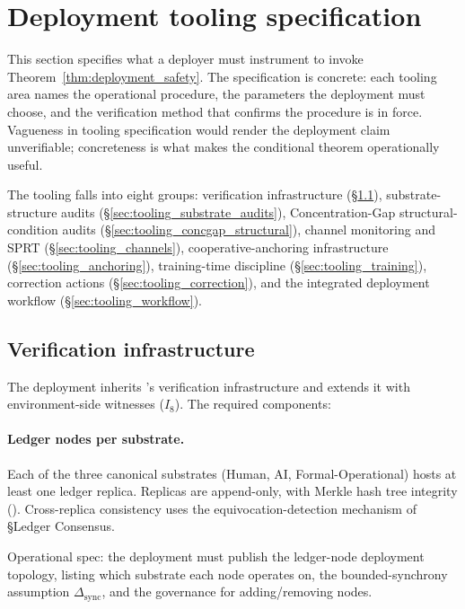 \section{Deployment tooling specification}
\label{sec:deployment_tooling}

This section specifies what a deployer must instrument to invoke
Theorem~\ref{thm:deployment_safety}. The specification is concrete:
each tooling area names the operational procedure, the parameters
the deployment must choose, and the verification method that
confirms the procedure is in force. Vagueness in tooling
specification would render the deployment claim unverifiable;
concreteness is what makes the conditional theorem operationally
useful.

The tooling falls into eight groups: verification infrastructure
(\S\ref{sec:tooling_verification}), substrate-structure audits
(\S\ref{sec:tooling_substrate_audits}), Concentration-Gap
structural-condition audits
(\S\ref{sec:tooling_concgap_structural}), channel monitoring and
SPRT (\S\ref{sec:tooling_channels}), cooperative-anchoring
infrastructure (\S\ref{sec:tooling_anchoring}),
training-time discipline (\S\ref{sec:tooling_training}),
correction actions (\S\ref{sec:tooling_correction}), and the
integrated deployment workflow (\S\ref{sec:tooling_workflow}).

\subsection{Verification infrastructure}
\label{sec:tooling_verification}

The deployment inherits \citep[Exogenous~Verification]{lasser2026exo}'s verification infrastructure
\citep{lasser2026exo} and extends it with environment-side witnesses
($I_8$). The required components:

\paragraph{Ledger nodes per substrate.}
Each of the three canonical substrates (Human, AI, Formal-Operational)
hosts at least one ledger replica. Replicas are append-only, with
Merkle hash tree integrity (\citep[\S Ledger Architecture]{lasser2026exo}).
Cross-replica consistency uses the equivocation-detection mechanism
of \citep[Exogenous~Verification]{lasser2026exo} \S Ledger Consensus.

Operational spec: the deployment must publish the ledger-node
deployment topology, listing which substrate each node operates on,
the bounded-synchrony assumption $\Delta_{\mathrm{sync}}$, and the
governance for adding/removing nodes.

